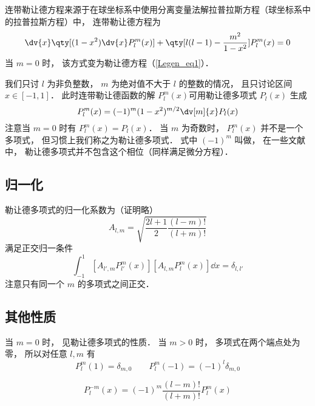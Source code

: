 

连带勒让德方程来源于在球坐标系中使用分离变量法解拉普拉斯方程（球坐标系中的拉普拉斯方程）中， 连带勒让德方程为
\begin{equation}
\dv{x} \qty[(1-x^2)\dv{x} P_l^m(x)] + \qty[l(l-1) - \frac{m^2}{1-x^2}]P_l^m(x) = 0
\end{equation}
当 $m = 0$ 时， 该方式变为勒让德方程（\autoref{Legen_eq1}）．

我们只讨 $l$ 为非负整数， $m$ 为绝对值不大于 $l$ 的整数的情况， 且只讨论区间 $x\in [-1,1]$． 此时连带勒让德函数的解 $P_l^m(x)$可用勒让德多项式 $P_l(x)$ 生成
\begin{equation}
P_l^m(x) = (-1)^m (1 - x^2)^{m/2} \dv[m]{x} P_l(x)
\end{equation}
注意当 $m = 0$ 时有 $P_l^m(x) = P_l(x)$． 当 $m$ 为奇数时， $P_l^m(x)$ 并不是一个多项式， 但习惯上我们称之为勒让德多项式． 式中 $(-1)^m$ 叫做， 在一些文献中， 勒让德多项式并不包含这个相位（同样满足微分方程）．

\subsection{归一化}
勒让德多项式的归一化系数为（证明略）
\begin{equation}\label{AsLgdr_eq3}
A_{l,m} = \sqrt{\frac{2l+1}{2}\frac{(l-m)!}{(l+m)!}}
\end{equation}
满足正交归一条件
\begin{equation}\label{AsLgdr_eq4}
\int_{-1}^1 [A_{l',m} P_{l'}^{m}(x)] [A_{l,m} P_l^{m}(x)] \dd{x} = \delta_{l,l'}
\end{equation}
注意只有同一个 $m$ 的多项式之间正交．

\subsection{其他性质}
当 $m = 0$ 时， 见勒让德多项式的性质． 当 $m > 0$ 时， 多项式在两个端点处为零， 所以对任意 $l, m$ 有
\begin{equation}
P_l^m(1) = \delta_{m, 0}
\qquad
P_l^m(-1) = (-1)^l \delta_{m, 0}
\end{equation}

\begin{equation}
P_l^{-m}(x) = (-1)^m \frac{(l-m)!}{(l+m)!} P_l^m(x)
\end{equation}
